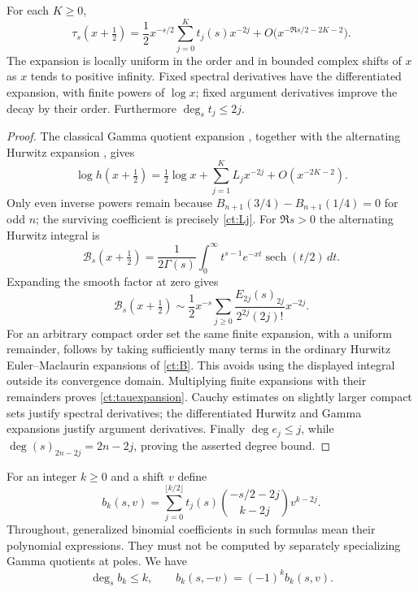 \begin{lemma}\label{ct:centered}
For each $K\ge0$,
\begin{equation}\label{ct:tauexpansion}
 \tau_s(x+\tfrac12)=\frac12x^{-s/2}
       \sum_{j=0}^Kt_j(s)x^{-2j}
       +O\bigl(x^{-\Re s/2-2K-2}\bigr).
\end{equation}
The expansion is locally uniform in the order and in bounded complex
shifts of $x$ as $x$ tends to positive infinity. Fixed spectral derivatives
have the differentiated expansion, with finite powers of $\log x$;
fixed argument derivatives improve the decay by their order.
Furthermore $\deg_s t_j\le2j$.
\end{lemma}
\begin{proof}
The classical Gamma quotient expansion \cite{DLMF}, together with the alternating Hurwitz expansion \cite{HuKim}, gives
\[
 \log h(x+\tfrac12)=\tfrac12\log x+
                 \sum_{j=1}^K L_jx^{-2j}+O(x^{-2K-2}).
\]
Only even inverse powers remain because
$B_{n+1}(3/4)-B_{n+1}(1/4)=0$ for odd $n$; the surviving coefficient
is precisely \eqref{ct:Lj}. For $\Re s>0$ the alternating Hurwitz
integral is
\[
 \mathcal B_s(x+\tfrac12)=\frac1{2\Gamma(s)}
  \int_0^\infty t^{s-1}e^{-xt}\operatorname{sech}(t/2)\,dt.
\]
Expanding the smooth factor at zero gives
\[
 \mathcal B_s(x+\tfrac12)\sim\frac12x^{-s}
        \sum_{j\ge0}\frac{E_{2j}(s)_{2j}}{2^{2j}(2j)!}x^{-2j}.
\]
For an arbitrary compact order set the same finite expansion, with a
uniform remainder, follows by taking sufficiently many terms in the
ordinary Hurwitz Euler--Maclaurin expansions of \eqref{ct:B}. This avoids
using the displayed integral outside its convergence domain. Multiplying
finite expansions with their remainders proves \eqref{ct:tauexpansion}.
Cauchy estimates on slightly larger compact sets justify spectral
 derivatives; the differentiated Hurwitz and Gamma expansions justify
argument derivatives. Finally $\deg e_j\le j$, while
$\deg(s)_{2n-2j}=2n-2j$, proving the asserted degree bound.
\end{proof}

For an integer $k\ge0$ and a shift $v$ define
\begin{equation}\label{ct:bk}
 b_k(s,v)=\sum_{j=0}^{\lfloor k/2\rfloor}
 t_j(s)\binom{-s/2-2j}{k-2j}v^{k-2j}.
\end{equation}
Throughout, generalized binomial coefficients in such formulas mean their
polynomial expressions. They must not be computed by separately
specializing Gamma quotients at poles. We have
\begin{equation}\label{ct:b-properties}
 \deg_s b_k\le k,\qquad b_k(s,-v)=(-1)^kb_k(s,v).
\end{equation}

